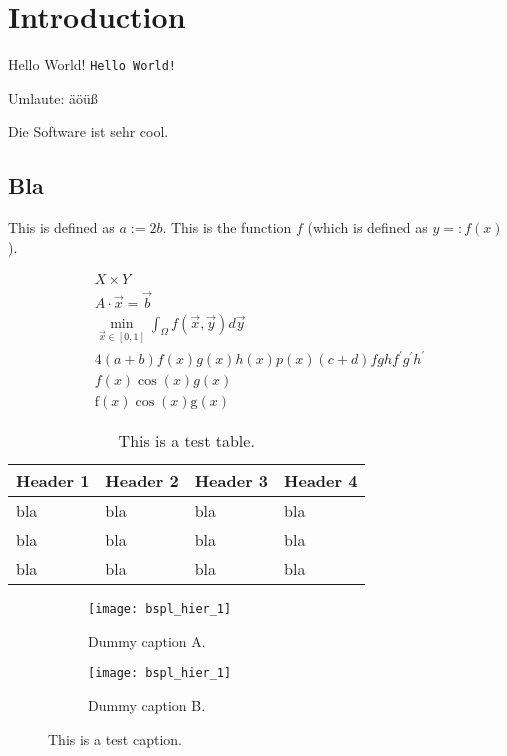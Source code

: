 
\chapter{Introduction}

\cite{zenger91}

Hello World! \texttt{Hello World!}

\nocite{*}

Umlaute: äöüß

Die Software \sgpp ist sehr cool.

\section{Bla}

This is defined as $a := 2b$.
This is the function $f$ (which is defined as $y =: f(x)$).

\begin{gather}
  X \times Y\\
  A \cdot \vec{x} = \vec{b}\\
  \min_{\vec{x} \in [0, 1]} \int_\Omega f(\vec{x}, \vec{y}) d\vec{y}\\
  4(a+b)f(x)g(x)h(x)p(x)(c+d)fghf^\prime g^\prime h^\prime\\
  f(x)\cos(x)g(x)\\
  \mathrm{f}(x)\cos(x)\mathrm{g}(x)
\end{gather}

\begin{table}
  \begin{tabular}{llll}
    \toprule
    \textbf{Header 1}&\textbf{Header 2}&\textbf{Header 3}&\textbf{Header 4}\\
    \midrule
    bla&bla&bla&bla\\
    bla&bla&bla&bla\\
    bla&bla&bla&bla\\
    \bottomrule
  \end{tabular}
  \caption{This is a test table.}
  \label{tbl:test}
\end{table}

\begin{figure}
  \begin{subfigure}{60mm}
    \texttt{[image: bspl\_hier\_1]}
    \caption{Dummy caption A.}
    \label{fig:test1a}
  \end{subfigure}
  \begin{subfigure}{60mm}
    \texttt{[image: bspl\_hier\_1]}
    \caption{Dummy caption B.}
    \label{fig:test1b}
  \end{subfigure}
  \caption{This is a test caption.}
  \label{fig:test1}
\end{figure}

